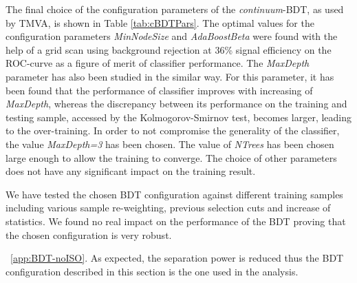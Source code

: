 The final choice of the configuration parameters of the \textit{continuum}-BDT,
as used by TMVA, is shown in Table \ref{tab:cBDTPars}.
The optimal values for the configuration parameters \textit{MinNodeSize} 
and \textit{AdaBoostBeta} were found with the help of a grid scan using background rejection at 36\% signal efficiency on the ROC-curve as a figure of merit of classifier performance. The \textit{MaxDepth} parameter
has also been studied in the similar way. For this parameter, it has been found
that the performance of classifier improves with increasing
of \textit{MaxDepth}, whereas the discrepancy between its performance on the training
and testing sample, accessed by the Kolmogorov-Smirnov test, becomes larger,
leading to the over-training. In order to not compromise the generality of the classifier,
the value \textit{MaxDepth=3} has been chosen.
The value of \textit{NTrees} has been chosen large enough to allow the training to converge.
The choice of other parameters does not have any significant impact on the training result.
 
We have tested the chosen BDT configuration against different training samples including
various sample re-weighting, previous selection cuts and increase of statistics.
We found no real impact on the performance of the BDT proving that the chosen
configuration is very robust.
 
~\ref{app:BDT-noISO}. As expected, the
separation power is reduced thus the BDT configuration described in this section is
the one used in the analysis.
 
